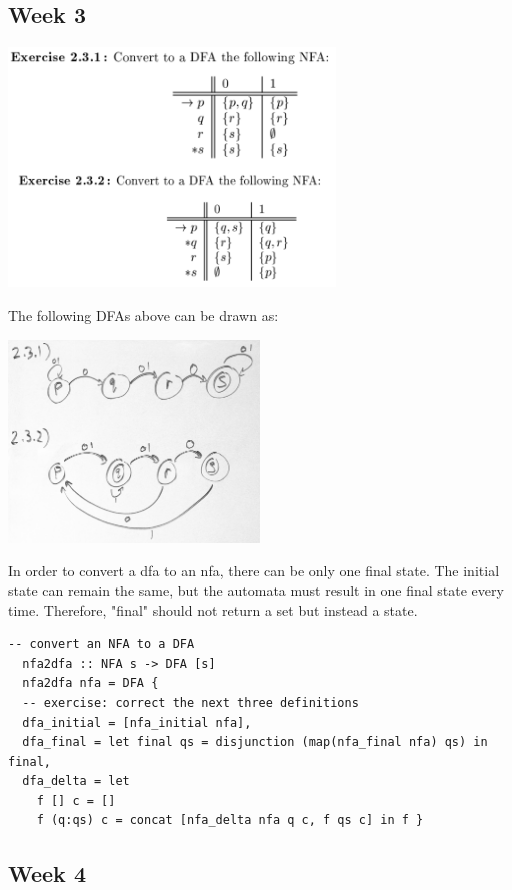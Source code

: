 \documentclass{article}
\theoremstyle{theorem}
\theoremstyle{definition}
\theoremstyle{remark}
\begin{document}
\subsection{Week 3}

\includegraphics[width=0.65\textwidth]{Images/2.3.1and2.3.2_chart.png}

\noindent
The following DFAs above can be drawn as:

\includegraphics[width=0.50\textwidth]{Images/2.3.1and2.3.2.png}

\medskip\noindent
In order to convert a dfa to an nfa, there can be only one final state. The initial state can remain the same, but the automata must result in one final state every time. Therefore, "final" should not return a set but instead a state.

\begin{lstlisting}[style=HaskellStyle]
  -- convert an NFA to a DFA
  nfa2dfa :: NFA s -> DFA [s]
  nfa2dfa nfa = DFA {
  -- exercise: correct the next three definitions 
  dfa_initial = [nfa_initial nfa],
  dfa_final = let final qs = disjunction (map(nfa_final nfa) qs) in final,
  dfa_delta = let
    f [] c = []
    f (q:qs) c = concat [nfa_delta nfa q c, f qs c] in f }
\end{lstlisting}

\subsection{Week 4}
\end{document}
